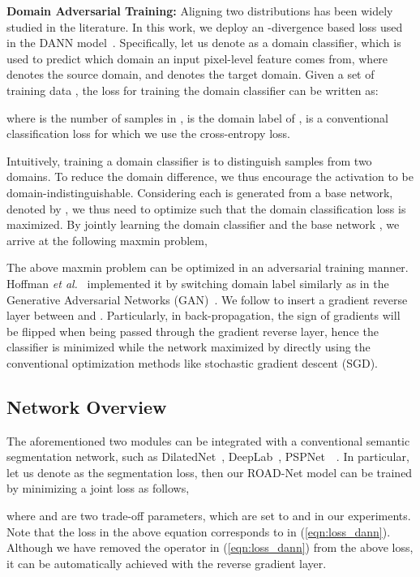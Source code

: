 \documentclass[10pt,twocolumn,letterpaper]{article}
\makeatletter
\def\etal{\emph{et al.}\@\xspace}
\makeatother
\begin{document}
\textbf{Domain Adversarial Training: } Aligning two distributions has been widely studied in the literature. In this work, we deploy an -divergence based loss used in the DANN model~\cite{ganin2015unsupervised}. Specifically, let us denote  as a domain classifier, which is used to predict which domain an input pixel-level feature  comes from, where  denotes the source domain, and  denotes the target domain. Given a set of training data , the loss for training the domain classifier  can be written as:

where  is the number of samples in ,  is the domain label of ,  is a conventional classification loss for which we use the cross-entropy loss. 

Intuitively, training a domain classifier is to distinguish samples from two domains. To reduce the domain difference, we thus encourage the activation  to be domain-indistinguishable. Considering each  is generated from a base network, denoted by , we thus need to optimize  such that the domain classification loss  is maximized. By jointly learning the domain classifier  and the base network , we arrive at the following maxmin problem, 

The above maxmin problem can be optimized in an adversarial training manner. Hoffman \etal~\cite{hoffman2016fcns} implemented it by switching domain label similarly as in the Generative Adversarial Networks (GAN)~\cite{goodfellow2014generative}. We follow \cite{ganin2015unsupervised} to insert a gradient reverse layer between  and . Particularly, in back-propagation, the sign of gradients will be flipped when being passed through the gradient reverse layer, hence the classifier  is minimized while the network   maximized by directly using the conventional optimization methods like stochastic gradient descent (SGD). 

\subsection{Network Overview}

The aforementioned two modules can be integrated with a conventional semantic segmentation network, such as DilatedNet~\cite{yu2015multi}, DeepLab~\cite{chen2016deeplab}, PSPNet~\cite{zhao2016pyramid}~\etc. In particular, let us denote  as the segmentation loss, then our ROAD-Net model can be trained by minimizing a joint loss as follows, 

where  and  are two trade-off parameters, which are set to  and  in our experiments. Note that the loss  in the above equation corresponds to  in (\ref{eqn:loss_dann}). Although we have removed the  operator in (\ref{eqn:loss_dann}) from the above loss, it can be automatically achieved with the reverse gradient layer. 
\end{document}
